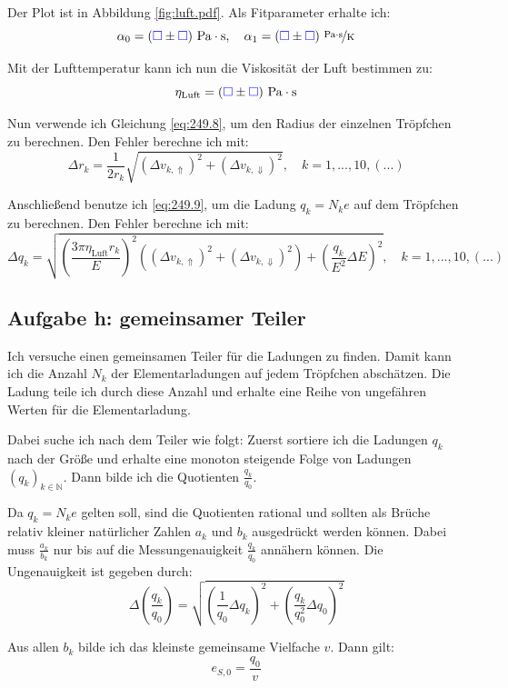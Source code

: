 \documentclass[11pt, ngerman]{article}
\newcommand{\emesswert}{\left(\messwert \pm \messwert \right)}
\newcommand{\messwert}{\textcolor{blue}{\square}}
\begin{document}
Der Plot ist in Abbildung \ref{fig:luft.pdf}. Als Fitparameter erhalte ich:
\[
	\alpha_0 = \unit[\emesswert]{Pa \cdot s}
	, \quad
	\alpha_1 = \unitfrac[\emesswert]{Pa \cdot s}K
\]

Mit der Lufttemperatur kann ich nun die Viskosität der Luft bestimmen zu:
\[ \eta_\text{Luft} = \unit[\emesswert]{Pa \cdot s} \]

Nun verwende ich Gleichung \eqref{eq:249.8}, um den Radius der einzelnen
Tröpfchen zu berechnen. Den Fehler berechne ich mit:
\[
	\Delta r_k = \frac 1{2 r_k} \sqrt{ \left( \Delta v_{k, \Uparrow} \right)^2 + \left( \Delta v_{k, \Downarrow} \right)^2 }
	, \quad
	k = 1, ..., 10, (...)
\]

Anschließend benutze ich \eqref{eq:249.9}, um die Ladung $q_k = N_ke$ auf dem
Tröpfchen zu berechnen. Den Fehler berechne ich mit:
\[
	\Delta q_k = \sqrt{
		\left( \frac{3 \pi \eta_\text{Luft} r_k}{E} \right)^2 \left(
		\left( \Delta v_{k, \Uparrow} \right)^2
		+ \left( \Delta v_{k, \Downarrow} \right)^2
		\right)
		+ \left( \frac{q_k}{E^2} \Delta E \right)^2
	}
	, \quad
	k = 1, ..., 10, (...)
\]

\subsection{Aufgabe h: gemeinsamer Teiler}

Ich versuche einen gemeinsamen Teiler für die Ladungen zu finden. Damit kann
ich die Anzahl $N_k$ der Elementarladungen auf jedem Tröpfchen abschätzen. Die
Ladung teile ich durch diese Anzahl und erhalte eine Reihe von ungefähren
Werten für die Elementarladung.

Dabei suche ich nach dem Teiler wie folgt: Zuerst sortiere ich die Ladungen
$q_k$ nach der Größe und erhalte eine monoton steigende Folge von Ladungen
$(q_k)_{k \in \mathbb N}$. Dann bilde ich die Quotienten $\frac{q_k}{q_0}$.

Da $q_k = N_k e$ gelten soll, sind die Quotienten rational und sollten als
Brüche relativ kleiner natürlicher Zahlen $a_k$ und $b_k$ ausgedrückt werden
können. Dabei muss $\frac{a_k}{b_k}$ nur bis auf die Messungenauigkeit
$\frac{q_k}{q_0}$ annähern können. Die Ungenauigkeit ist gegeben durch:
\[
	\Delta \left( \frac{q_k}{q_0} \right)
	= \sqrt{
		\left( \frac{1}{q_0} \Delta q_k \right)^2
		+ \left( \frac{q_k}{q_0^2} \Delta q_0 \right)^2
	}
\]

Aus allen $b_k$ bilde ich das kleinste gemeinsame Vielfache $v$. Dann gilt:
\[ e_{S, 0} = \frac{q_0}v \]
\end{document}
